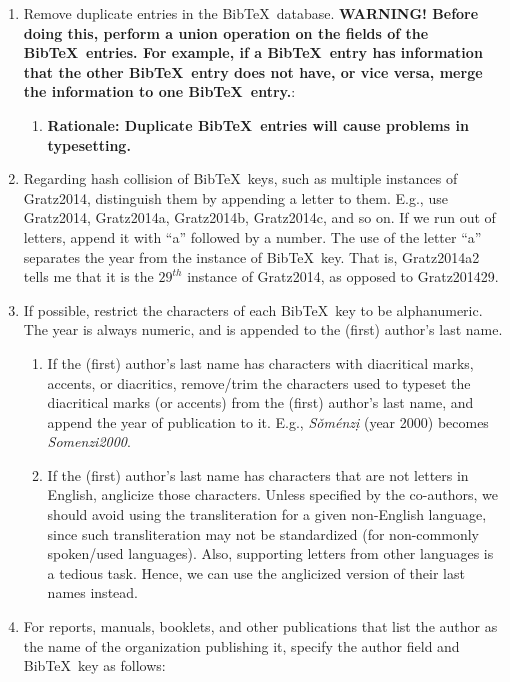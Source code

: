\documentclass[letter,12pt]{article}
\begin{document}
\begin{enumerate}
\begin{enumerate}
\begin{enumerate}
		\end{enumerate}
	\item Remove duplicate entries in the {\sc Bib}\TeX\ database. {\bf WARNING! Before doing this, perform a union operation on the fields of the {\sc Bib}\TeX\ entries. For example, if a {\sc Bib}\TeX\ entry has information that the other {\sc Bib}\TeX\ entry does not have, or vice versa, merge the information to one {\sc Bib}\TeX\ entry.}: \vspace{-0.2cm}
		\begin{enumerate} \itemsep -2pt
		\item {\bf Rationale: Duplicate {\sc Bib}\TeX\ entries will cause problems in typesetting.}
		\end{enumerate}
	\item Regarding hash collision of {\sc Bib}\TeX\ keys, such as multiple instances of Gratz2014, distinguish them by appending a letter to them. E.g., use Gratz2014, Gratz2014a, Gratz2014b, Gratz2014c, and so on. If we run out of letters, append it with ``a'' followed by a number. The use of the letter ``a'' separates the year from the instance of {\sc Bib}\TeX\ key. That is, Gratz2014a2 tells me that it is the $29^{th}$ instance of Gratz2014, as opposed to Gratz201429.
	\item If possible, restrict the characters of each {\sc Bib}\TeX\ key to be alphanumeric. The year is always numeric, and is appended to the (first) author's last name. \vspace{-0.2cm}
		\begin{enumerate} \itemsep -2pt
		\item If the (first) author's last name has characters with diacritical marks, accents, or diacritics, remove/trim the characters used to typeset the diacritical marks (or accents) from the (first) author's last name, and append the year of publication to it. E.g., {\it S{\v{o}}m{\'{e}}nz{\d{i}}} (year 2000) becomes {\it Somenzi2000}.
		\item If the (first) author's last name has characters that are not letters in English, anglicize those characters. Unless specified by the co-authors, we should avoid using the transliteration for a given non-English language, since such transliteration may not be standardized (for non-commonly spoken/used languages). Also, supporting letters from other languages is a tedious task. Hence, we can use the anglicized version of their last names instead.
		\end{enumerate}
	\item For reports, manuals, booklets, and other publications that list the author as the name of the organization publishing it, specify the author field and {\sc Bib}\TeX\ key as follows: \vspace{-0.2cm}

\end{enumerate}
\end{enumerate}
\end{document}
